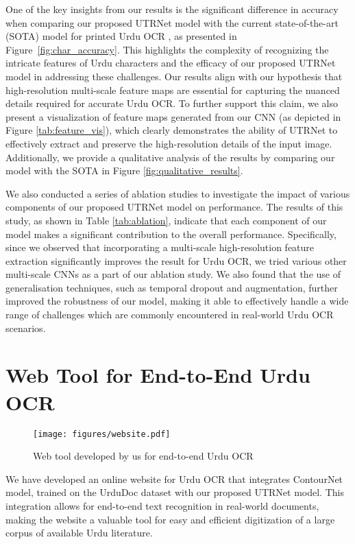 \documentclass[runningheads]{llncs}
\newcommand{\ModelName}{{UTRNet}\xspace}
\newcommand{\DetectionDataset}{{UrduDoc}\xspace}
\begin{document}
One of the key insights from our results is the significant difference in accuracy when comparing our proposed \ModelName model with the current state-of-the-art (SOTA) model for printed Urdu OCR \cite{iiith17urdu}, as presented in Figure~\ref{fig:char_accuracy}. This highlights the complexity of recognizing the intricate features of Urdu characters and the efficacy of our proposed \ModelName model in addressing these challenges. Our results align with our hypothesis that high-resolution multi-scale feature maps are essential for capturing the nuanced details required for accurate Urdu OCR. To further support this claim, we also present a visualization of feature maps generated from our CNN (as depicted in Figure \ref{tab:feature_vis}), which clearly demonstrates the ability of \ModelName to effectively extract and preserve the high-resolution details of the input image. Additionally, we provide a qualitative analysis of the results by comparing our model with the SOTA \cite{iiith17urdu} in Figure \ref{fig:qualitative_results}.

We also conducted a series of ablation studies to investigate the impact of various components of our proposed \ModelName model on performance. The results of this study, as shown in Table \ref{tab:ablation}, indicate that each component of our model makes a significant contribution to the overall performance. Specifically, since we observed that incorporating a multi-scale high-resolution feature extraction significantly improves the result for Urdu OCR, we tried various other multi-scale CNNs as a part of our ablation study. We also found that the use of generalisation techniques, such as temporal dropout and augmentation, further improved the robustness of our model, making it able to effectively handle a wide range of challenges which are commonly encountered in real-world Urdu OCR scenarios. 
\section{Web Tool for End-to-End Urdu OCR}
\label{section:webtool}


\begin{wrapfigure}{r}{0.6\linewidth}
	\setlength{\columnsep}{0pt}\centering
	\vspace{-2.5em}
	\texttt{[image: figures/website.pdf]}
	\vspace{-1.8em}
	\caption{Web tool developed by us for end-to-end Urdu OCR}
\end{wrapfigure}
We have developed an online website for Urdu OCR that integrates ContourNet \cite{contournet_orig} model, trained on the {\DetectionDataset} dataset with our proposed \ModelName model. This integration allows for end-to-end text recognition in real-world documents, making the website a valuable tool for easy and efficient digitization of a large corpus of available Urdu literature. 
\end{document}
